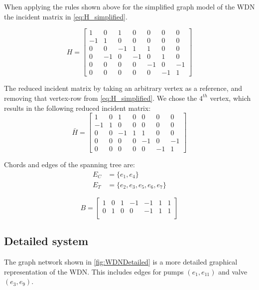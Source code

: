 When applying the rules shown above for the simplified graph model of the WDN the incident matrix in \cref{eq:H_simplified}.

\begin{equation}
	H = \begin{bmatrix}
		1 & 0 & 1 & 0 & 0 & 0 & 0\\
		-1 & 1 & 0 & 0 & 0 & 0 & 0\\
		0 & 0 & -1 & 1 & 1 & 0 & 0\\
		0 & -1 & 0 & -1 & 0 & 1 & 0\\
		0 & 0 & 0 & 0 & -1 &  0  & -1\\
		0 & 0 & 0 & 0 & 0 & -1 & 1
	\end{bmatrix}
	\label{eq:H_simplified}
\end{equation} %


The reduced incident matrix by taking an arbitrary vertex as a reference, and removing that vertex-row from \cref{eq:H_simplified}. We chose the $4^{th}$ vertex, which results in the following reduced incident matrix:
\begin{equation}
	\bar{H} = \begin{bmatrix}
		1 & 0 & 1 & 0 & 0 & 0 & 0\\
		-1 & 1 & 0 & 0 & 0 & 0 & 0\\
		0 & 0 & -1 & 1 & 1 & 0 & 0\\
		0 & 0 & 0 & 0 & -1 &  0  & -1\\
		0 & 0 & 0 & 0 & 0 & -1 & 1
	\end{bmatrix}
\end{equation}

Chords and edges of the spanning tree are:
\begin{equation} 
	\begin{split}
		E_{C} &= \{e_{1},e_{4}\}   \\ E_{T} &= \{e_2,e_3,e_5,e_6,e_7\}
	\end{split}
\end{equation}


\begin{equation}
	B = \begin{bmatrix}
		1 & 0 & 1 & -1 & -1 & 1 & 1\\
		0 & 1 & 0 & 0 & -1 & 1 & 1\\
	\end{bmatrix}
\end{equation}
\newpage

\subsection{Detailed system}
The graph network shown in \cref{fig:WDNDetailed} is a more detailed graphical representation of the WDN. This includes edges for pumps $(e_{1},e_{11})$ and valve $(e_{3},e_{9})$. 

